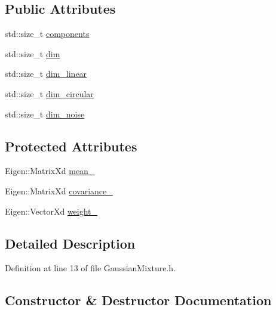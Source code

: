 \subsection*{Public Attributes}
\begin{DoxyCompactItemize}
\item 
std\+::size\+\_\+t \mbox{\hyperlink{classbfl_1_1GaussianMixture_a02cc284327dbaa6b90c653dd2faccf88}{components}}
\item 
std\+::size\+\_\+t \mbox{\hyperlink{classbfl_1_1GaussianMixture_a3f2b18801e72fa3bf0d6edc778662a8d}{dim}}
\item 
std\+::size\+\_\+t \mbox{\hyperlink{classbfl_1_1GaussianMixture_a22a0fbc77f90d9d75e89d7898484c05a}{dim\+\_\+linear}}
\item 
std\+::size\+\_\+t \mbox{\hyperlink{classbfl_1_1GaussianMixture_a23f3b92753266475a9bff8ee7e1c9518}{dim\+\_\+circular}}
\item 
std\+::size\+\_\+t \mbox{\hyperlink{classbfl_1_1GaussianMixture_adaa8d9c6d03be835769cc848aba81067}{dim\+\_\+noise}}
\end{DoxyCompactItemize}
\subsection*{Protected Attributes}
\begin{DoxyCompactItemize}
\item 
Eigen\+::\+Matrix\+Xd \mbox{\hyperlink{classbfl_1_1GaussianMixture_a12a1175e838a753129f4cc133b2c1a9c}{mean\+\_\+}}
\item 
Eigen\+::\+Matrix\+Xd \mbox{\hyperlink{classbfl_1_1GaussianMixture_aab086cc1a89a8b7efd15303853e52920}{covariance\+\_\+}}
\item 
Eigen\+::\+Vector\+Xd \mbox{\hyperlink{classbfl_1_1GaussianMixture_ac9ce000575d6b29ad8e1a756d750faff}{weight\+\_\+}}
\end{DoxyCompactItemize}


\subsection{Detailed Description}


Definition at line 13 of file Gaussian\+Mixture.\+h.



\subsection{Constructor \& Destructor Documentation}
\mbox{\label{classbfl_1_1GaussianMixture_a0822b81102146cd9ba62223e41c97b38}} 
